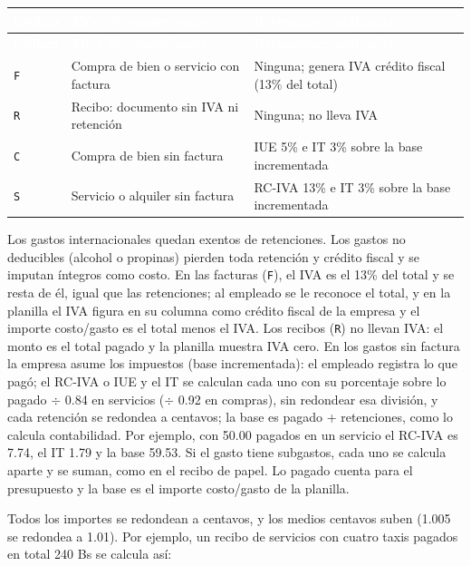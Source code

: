 \documentclass[11pt,letterpaper]{article}
\newcommand{\cabecera}{\rowcolor{maxamPrimario}}
\newcommand{\tth}[1]{\textcolor{white}{\textbf{#1}}}
\newcommand{\code}[1]{\nolinkurl{#1}}
\begin{document}
\begin{xltabular}{\textwidth}{L{1.6cm} L{5.4cm} Y}
\cabecera \tth{Código} & \tth{Tipo de comprobante} & \tth{Retenciones aplicadas} \\
\endfirsthead
\cabecera \tth{Código} & \tth{Tipo de comprobante} & \tth{Retenciones aplicadas} \\
\endhead
{} \code{F} & Compra de bien o servicio con factura & Ninguna; genera IVA crédito fiscal (13\% del total) \\
\code{R} & Recibo: documento sin IVA ni retención & Ninguna; no lleva IVA \\
 \code{C} & Compra de bien sin factura & IUE 5\% e IT 3\% sobre la base incrementada \\
\code{S} & Servicio o alquiler sin factura & RC-IVA 13\% e IT 3\% sobre la base incrementada \\
\end{xltabular}

Los gastos internacionales quedan exentos de retenciones. Los gastos no deducibles (alcohol o propinas) pierden toda retención y crédito fiscal y se imputan íntegros como costo. En las facturas (\code{F}), el IVA es el 13\% del total y se resta de él, igual que las retenciones; al empleado se le reconoce el total, y en la planilla el IVA figura en su columna como crédito fiscal de la empresa y el importe costo/gasto es el total menos el IVA. Los recibos (\code{R}) no llevan IVA: el monto es el total pagado y la planilla muestra IVA cero. En los gastos sin factura la empresa asume los impuestos (base incrementada): el empleado registra lo que pagó; el RC-IVA o IUE y el IT se calculan cada uno con su porcentaje sobre lo pagado $\div$ 0.84 en servicios ($\div$ 0.92 en compras), sin redondear esa división, y cada retención se redondea a centavos; la base es pagado + retenciones, como lo calcula contabilidad. Por ejemplo, con 50.00 pagados en un servicio el RC-IVA es 7.74, el IT 1.79 y la base 59.53. Si el gasto tiene subgastos, cada uno se calcula aparte y se suman, como en el recibo de papel. Lo pagado cuenta para el presupuesto y la base es el importe costo/gasto de la planilla.

Todos los importes se redondean a centavos, y los medios centavos suben (1.005 se redondea a 1.01). Por ejemplo, un recibo de servicios con cuatro taxis pagados en total 240 Bs se calcula así:
\end{document}
